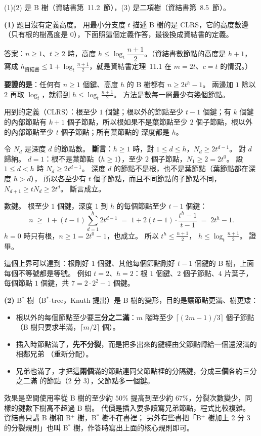 \begin{pastsoln}
(1)(2) 是 B 樹（資結書第~11.2~節），(3) 是二項樹（資結書第~8.5~節）。

\textbf{(1)} 題目沒有定義高度。 用最小分支度 $t$ 描述 B 樹的是 CLRS，它的高度數邊（只有根的樹高度是
$0$），下面照這個定義作答，最後換成資結書的定義。

答案：$n \ge 1$、$t \ge 2$ 時，高度 $h \le \log_t \dfrac{n + 1}{2}$。（資結書數節點的高度是 $h + 1$，
寫成 $h_{\text{資結書}} \le 1 + \log_t \frac{n+1}{2}$，就是資結書定理~11.1 在 $m = 2t$、$c = t$ 的情況。）

\textbf{要證的是}：任何有 $n \ge 1$ 個鍵、高度 $h$ 的 B 樹都有 $n \ge 2t^h - 1$。 兩邊加 $1$ 除以 $2$
再取 $\log_t$，就得到 $h \le \log_t \frac{n+1}{2}$。 方法是數每一層最少有幾個節點。

用到的定義（CLRS）：根至少 $1$ 個鍵；根以外的節點至少 $t - 1$ 個鍵；有 $k$ 個鍵的內部節點有 $k + 1$
個子節點，所以根如果不是葉節點至少 $2$ 個子節點，根以外的內部節點至少 $t$ 個子節點；所有葉節點的
深度都是 $h$。

令 $N_d$ 是深度 $d$ 的節點數。 \textbf{斷言}：$h \ge 1$ 時，對 $1 \le d \le h$，$N_d \ge 2t^{d-1}$。
對 $d$ 歸納。 $d = 1$：根不是葉節點（$h \ge 1$），至少 $2$ 個子節點，$N_1 \ge 2 = 2t^0$。 設
$1 \le d < h$ 時 $N_d \ge 2t^{d-1}$。 深度 $d$ 的節點不是根，也不是葉節點（葉節點都在深度 $h > d$），
所以各至少有 $t$ 個子節點，而且不同節點的子節點不同，$N_{d+1} \ge t N_d \ge 2t^d$。 斷言成立。

數鍵。 根至少 $1$ 個鍵，深度 $1$ 到 $h$ 的每個節點至少 $t - 1$ 個鍵：
\[
n \;\ge\; 1 + (t - 1) \sum_{d=1}^{h} 2t^{d-1}
\;=\; 1 + 2(t - 1) \cdot \frac{t^h - 1}{t - 1}
\;=\; 2t^h - 1.
\]
$h = 0$ 時只有根，$n \ge 1 = 2t^0 - 1$，也成立。 所以 $t^h \le \frac{n+1}{2}$，
$h \le \log_t \frac{n+1}{2}$。 證畢。

這個上界可以達到：根剛好 $1$ 個鍵、其他每個節點剛好 $t - 1$ 個鍵的 B 樹，上面每個不等號都是等號。
例如 $t = 2$、$h = 2$：根 $1$ 個鍵、$2$ 個子節點、$4$ 片葉子，每個節點 $1$ 個鍵，共 $7 = 2 \cdot 2^2 - 1$
個鍵。

\textbf{(2)} B$^*$ 樹（B$^*$-tree，Knuth 提出）是 B 樹的變形，目的是讓節點更滿、樹更矮：
\begin{itemize}
\item 根以外的每個節點至少要\textbf{三分之二滿}：$m$ 階時至少 $\lceil (2m-1)/3 \rceil$ 個子節點
（B 樹只要求半滿，$\lceil m/2 \rceil$ 個）。
\item 插入時節點滿了，\textbf{先不分裂}，而是把多出來的鍵經由父節點轉給一個還沒滿的相鄰兄弟
（重新分配）。
\item 兄弟也滿了，才把這\textbf{兩個}滿的節點連同父節點裡的分隔鍵，分成\textbf{三個}各約三分之二滿
的節點（2 分 3），父節點多一個鍵。
\end{itemize}
效果是空間使用率從 B 樹的至少約 $50\%$ 提高到至少約 $67\%$，分裂次數變少，同樣的鍵數下樹高不超過
B 樹。 代價是插入要多讀寫兄弟節點，程式比較複雜。 資結書只講 B 樹和 B$^{+}$ 樹，B$^*$ 樹不在書裡；
另外有些書把「B$^{+}$ 樹加上 2 分 3 的分裂規則」也叫 B$^*$ 樹，作答時寫出上面的核心規則即可。


\end{pastsoln}
